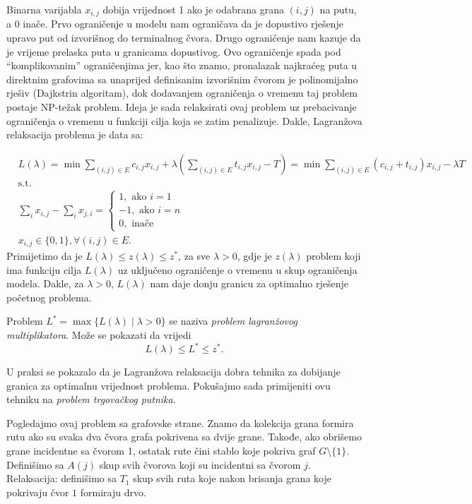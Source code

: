 \documentclass[a4paper, utf8, 11pt, colorlinks]{book}
\begin{document}
Binarna varijabla $x_{i,j}$ dobija vrijednost 1 ako je odabrana grana $(i,j)$ na   putu, a 0 inače.  
Prvo ograničenje u modelu nam ograničava da je dopustivo rješenje upravo put od izvorišnog do terminalnog čvora. Drugo ograničenje nam kazuje da je vrijeme prelaska puta u granicama dopustivog. Ovo ograničenje spada pod ``komplikovanim'' ograničenjima jer, kao što znamo,  pronalazak najkraćeg puta u direktnim grafovima sa unaprijed definisanim izvorišnim čvorom je polinomijalno rješiv (Dajkstrin algoritam), dok dodavanjem ograničenja o vremenu taj problem postaje NP-težak problem. Ideja je sada relaksirati ovaj problem uz prebacivanje ograničenja o vremenu u funkciji cilja koja se zatim penalizuje. 
Dakle, Lagranžova relaksacija problema je data sa:

\begin{align*}
       &L(\lambda)= \min\sum_{(i,j) \in E }c_{i,j}x_{i,j}  + \lambda(\sum_{(i,j) \in E} t_{i,j} x_{i,j} - T ) = \min \sum_{(i,j) \in E} (c_{i,j} + t_{i,j} )x_{i,j} - \lambda T \\
        &\mbox{s.t. }\\
    & \sum_{i} x_{i,j} - \sum_{i} x_{j,i} = \begin{cases}  
                                               1, \mbox{ ako } i=1 \\
                                              -1, \mbox{ ako } i=n \\
                                               0, \mbox{ inače }
                                            \end{cases} \\
     & x_{i,j} \in \{0, 1 \}, \forall (i,j) \in E.
\end{align*}
Primijetimo da je $L(\lambda) \leq z(\lambda)  \leq z^*$, za sve $\lambda > 0$, gdje je $z(\lambda)$ problem koji ima funkciju cilja $L(\lambda)$ uz uključeno ograničenje o vremenu u skup ograničenja modela. Dakle, za $\lambda >0$, $L(\lambda)$ nam daje donju granicu za optimalno rješenje početnog problema. 

Problem $L^* = \max \{ L(\lambda) \mid \lambda > 0  \}$ se naziva \emph{problem lagranžovog multiplikatora}. Može se pokazati da vrijedi 
$$ L(\lambda) \leq L^* \leq z^*.$$

U praksi se pokazalo da je Lagranžova relaksacija dobra tehnika za dobijanje granica za optimalnu vrijednost problema. Pokušajmo sada primijeniti ovu tehniku na \emph{problem trgovačkog putnika}.  

Pogledajmo ovaj problem sa grafovske strane. Znamo da kolekcija grana formira rutu ako su svaka dva čvora grafa pokrivena sa dvije grane. Takođe, ako obrišemo grane incidentne sa čvorom 1, ostatak rute čini stablo koje pokriva graf  $G\setminus \{1\}$.  
Definišimo sa $A(j)$ skup svih čvorova koji su incidentni sa čvorom $j$. Relaksacija: definišimo sa $T_1$ skup svih ruta koje nakon brisanja grana koje pokrivaju čvor $1$ formiraju drvo.  
\end{document}
